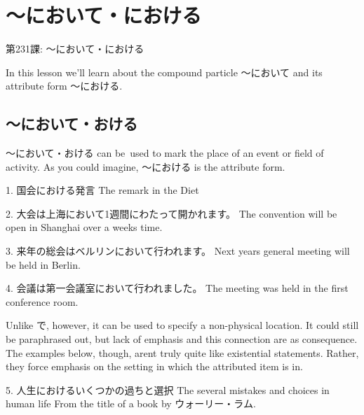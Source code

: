     
\chapter{～において・における}

\begin{center}
\begin{Large}
第231課: ～において・における 
\end{Large}
\end{center}
 
\par{  In this lesson we'll learn about the compound particle ～において and its attribute form ～における. }
      
\section{～において・おける}
 
\par{ ～において・おける can be used to mark the place of an event or field of activity. As you could imagine, ～における is the attribute form. }
 
\par{1. 国会における発言 \hfill\break
The remark in the Diet }
 
\par{2. 大会は上海において1週間にわたって開かれます。 \hfill\break
The convention will be open in Shanghai over a week\textquotesingle s time. }
 
\par{3. 来年の総会はベルリンにおいて行われます。 \hfill\break
Next year\textquotesingle s general meeting will be held in Berlin. }
 
\par{4. 会議は第一会議室において行われました。 \hfill\break
The meeting was held in the first conference room. }
 
\par{ Unlike で, however, it can be used to specify a non-physical location. It could still be paraphrased out, but lack of emphasis and this connection are as consequence. The examples below, though, aren\textquotesingle t truly quite like existential statements. Rather, they force emphasis on the setting in which the attributed item is in. }
 
\par{5. 人生におけるいくつかの過ちと選択 \hfill\break
The several mistakes and choices in human life \hfill\break
From the title of a book by ウォーリー・ラム. }
 
